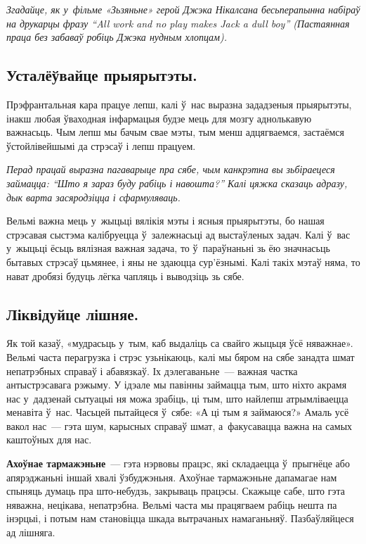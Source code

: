 \emph{Згадайце, як у~фільме «Зьзяньне» герой Джэка Нікалсана бесьперапынна набіраў на друкарцы фразу ``All work and no play makes Jack a dull boy'' (Пастаянная праца без забаваў робіць Джэка нудным хлопцам).}

\subsection*{Усталёўвайце прыярытэты.}

Прэфрантальная кара працуе лепш, калі ў~нас выразна зададзеныя прыярытэты, інакш любая ўваходная інфармацыя будзе мець для мозгу аднолькавую важнасьць. Чым лепш мы бачым свае мэты, тым менш адцягваемся, застаёмся ўстойлівейшымі да стрэсаў і лепш працуем.

\emph{Перад працай выразна пагаварыце пра сябе, чым канкрэтна вы зьбіраецеся займацца: ``Што я зараз буду рабіць і навошта?'' Калі цяжка сказаць адразу, дык варта засяродзіцца і сфармуляваць.}

Вельмі важна мець у~жыцьці вялікія мэты і ясныя прыярытэты, бо нашая стрэсавая сыстэма калібруецца ў~залежнасьці ад выстаўленых задач. Калі ў~вас у~жыцьці ёсьць вялізная важная задача, то ў~параўнаньні зь ёю значнасьць бытавых стрэсаў цьмянее, і яны не здаюцца сур'ёзнымі. Калі такіх мэтаў няма, то нават дробязі будуць лёгка чапляць і выводзіць зь сябе.

\subsection*{Ліквідуйце лішняе.}

Як той казаў, «мудрасьць у~тым, каб выдаліць са свайго жыцьця ўсё няважнае». Вельмі часта перагрузка і стрэс узьнікаюць, калі мы бяром на сябе занадта шмат непатрэбных справаў і абавязкаў. Іх дэлегаваньне~--- важная частка антыстрэсавага рэжыму. У ідэале мы павінны займацца тым, што ніхто акрамя нас у~дадзенай сытуацыі ня можа зрабіць, ці тым, што найлепш атрымліваецца менавіта ў~нас. Часьцей пытайцеся ў~сябе: «А ці тым я займаюся?» Амаль усё вакол нас~--- гэта шум, карысных справаў шмат, а~факусавацца важна на самых каштоўных для нас.

\textbf{Ахоўнае тармажэньне}~--- гэта нэрвовы працэс, які складаецца ў~прыгнёце або апярэджаньні іншай хвалі ўзбуджэньня. Ахоўнае тармажэньне дапамагае нам спыняць думаць пра што-небудзь, закрываць працэсы. Скажыце сабе, што гэта няважна, нецікава, непатрэбна. Вельмі часта мы працягваем рабіць нешта па інэрцыі, і потым нам становіцца шкада вытрачаных намаганьняў. Пазбаўляйцеся ад лішняга.

